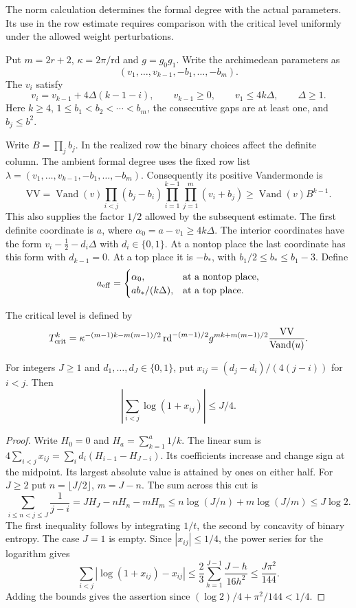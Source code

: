 The norm calculation determines the formal degree with the actual parameters. Its use in the row estimate requires comparison with the critical level uniformly under the allowed weight perturbations.

\begin{paramdefinition}\label{hyp:critical-level-weights}
Put \(m=2r+2\), \(\kappa=2\pi/\mathrm{rd}\) and \(g=g_0g_1\).
Write the archimedean parameters as
\[
 (v_1,\ldots,v_{k-1},-b_1,\ldots,-b_m).
\]
The \(v_i\) satisfy
\[
 v_i=v_{k-1}+4\Delta(k-1-i),\qquad
 v_{k-1}\ge0,\qquad v_1\le4k\Delta,\qquad\Delta\ge1.
\]
Here \(k\ge4\), \(1\le b_1<b_2<\cdots<b_m\), the consecutive
gaps are at least one, and \(b_j\le b^2\).

Write \(B=\prod_j b_j\). In the realized row the binary choices affect the definite column. The ambient formal degree uses the fixed row list \(\lambda=(v_1,\ldots,v_{k-1},-b_1,\ldots,-b_m)\). Consequently its positive Vandermonde is
\[
 \mathrm{VV}=\operatorname{Vand}(v)
    \prod_{i<j}(b_j-b_i)\prod_{i=1}^{k-1}\prod_{j=1}^m(v_i+b_j)
       \ge\operatorname{Vand}(v)B^{k-1}.
\]
This also supplies the factor \(1/2\) allowed by the subsequent estimate.
The first definite coordinate is \(a\), where
\(\alpha_0=a-v_1\ge4k\Delta\).
The interior coordinates have the form
\(v_i-\tfrac12-d_i\Delta\) with \(d_i\in\{0,1\}\).
At a nontop place the last coordinate has this form with
\(d_{k-1}=0\). At a top place it is \(-b_*\), with
\(b_1/2\le b_*\le b_1-3\). Define
\[
 a_{\rm eff}=
 \begin{cases}
 \alpha_0,&\text{at a nontop place},\\
 ab_* /(k\Delta),&\text{at a top place}.
 \end{cases}
\]
\end{paramdefinition}

The critical level is defined by
\[
 T_{\rm crit}^k=\kappa^{-(m-1)k-m(m-1)/2}\,
   \mathrm{rd}^{-(m-1)/2}g^{mk+m(m-1)/2}
       \frac{\mathrm{VV}}{\operatorname{Vand}(u)} .
\]

\begin{auxlemma}\label{lem:binary-vandermonde-run}
For integers \(J\ge1\) and \(d_1,\ldots,d_J\in\{0,1\}\), put
\(x_{ij}=(d_j-d_i)/(4(j-i))\) for \(i<j\). Then
\[
 \left|\sum_{i<j}\log(1+x_{ij})\right|\le J/4 .
\]
\end{auxlemma}
\begin{proof}
Write \(H_0=0\) and \(H_a=\sum_{k=1}^a1/k\). The linear sum is
\(4\sum_{i<j}x_{ij}=\sum_i d_i(H_{i-1}-H_{J-i})\).
Its coefficients increase and change sign at the midpoint. Its largest
absolute value is attained by ones on either half. For \(J\ge2\) put
\(n=\lfloor J/2\rfloor\), \(m=J-n\). The sum across this cut is
\[
 \sum_{i\le n<j\le J}\frac1{j-i}
 =JH_J-nH_n-mH_m
 \le n\log(J/n)+m\log(J/m)\le J\log2 .
\]
The first inequality follows by integrating \(1/t\), the second by
concavity of binary entropy. The case \(J=1\) is empty. Since
\(|x_{ij}|\le1/4\), the power series for the logarithm gives
\[
 \sum_{i<j}|\log(1+x_{ij})-x_{ij}|
 \le\frac{2}{3}\sum_{h=1}^{J-1}\frac{J-h}{16h^2}
 \le\frac{J\pi^2}{144}.
\]
Adding the bounds gives the assertion since \((\log2)/4+\pi^2/144<1/4\).
\end{proof}

